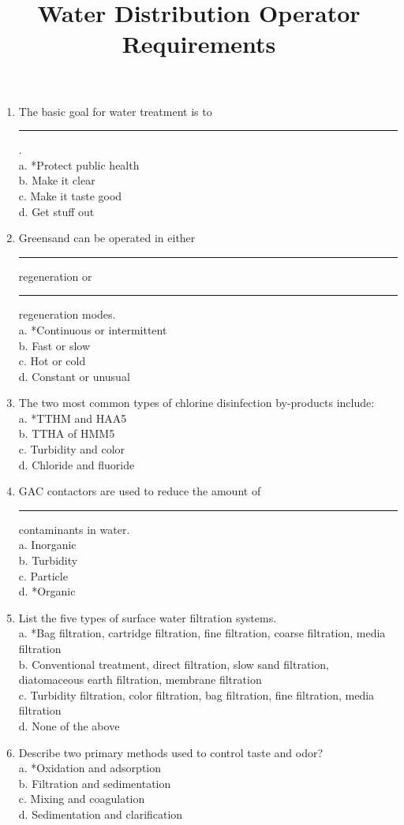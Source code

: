 \documentclass[10pt]{article}
\title{Water Distribution Operator Requirements }
\author{}
\date{}
\begin{document}
\begin{enumerate}
\item The basic goal for water treatment is to \rule{2cm}{0.3pt}.\\
a.  *Protect public health\\
b.  Make it clear\\
c.  Make it taste good\\
d.  Get stuff out\\

\item Greensand can be operated in either \rule{2cm}{0.5pt} regeneration or \rule{2cm}{0.5pt} regeneration modes.\\
a.  *Continuous or intermittent\\
b.  Fast or slow\\
c.  Hot or cold\\
d.  Constant or unusual\\

\item The two most common types of chlorine disinfection by-products include:\\
a.  *TTHM and HAA5\\
b.  TTHA of HMM5\\
c.  Turbidity and color\\
d.  Chloride and fluoride\\

\item GAC contactors are used to reduce the amount of \rule{2cm}{0.5pt} contaminants in water.\\
a.  Inorganic\\
b.  Turbidity\\
c.  Particle\\
d.  *Organic\\

\item List the five types of surface water filtration systems.\\
a. *Bag filtration, cartridge filtration, fine filtration, coarse filtration, media filtration\\
b.  Conventional treatment, direct filtration, slow sand filtration, diatomaceous earth filtration, membrane filtration\\
c.  Turbidity filtration, color filtration, bag filtration, fine filtration, media filtration\\
d.  None of the above\\

\item Describe two primary methods used to control taste and odor?\\
a.  *Oxidation and adsorption\\
b.  Filtration and sedimentation\\
c.  Mixing and coagulation\\
d.  Sedimentation and clarification\\


\end{enumerate}
\end{document}
